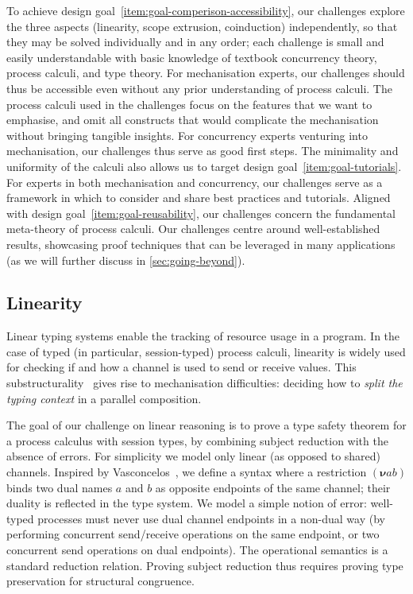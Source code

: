 \documentclass[runningheads]{llncs}
\begin{document}
To achieve design goal~\ref{item:goal-comperison-accessibility}, our challenges explore the three aspects
(linearity, scope extrusion, coinduction) independently, so that they
may be solved individually and in any order; each challenge is small and easily understandable with basic knowledge of
textbook concurrency theory, process calculi, and type theory.
For mechanisation experts, our challenges should thus be accessible even without any prior understanding of process calculi.
The process calculi used in the challenges focus on the features that we want to emphasise, and omit all constructs that would complicate the mechanisation without bringing tangible insights.
For concurrency experts venturing into mechanisation, our challenges thus serve as good first steps.
The minimality and uniformity of the calculi also allows us to target design goal~\ref{item:goal-tutorials}.
For experts in both mechanisation and concurrency, our challenges serve as a framework in which to consider and share best practices and tutorials.
Aligned with design goal~\ref{item:goal-reusability}, our challenges concern the fundamental meta-theory of process calculi.
Our challenges centre around well-established results, showcasing proof techniques that can be leveraged in many applications (as we will further discuss in \cref{sec:going-beyond}).

\subsection{Linearity}
Linear typing systems enable the tracking of resource usage in a program. In
the case of typed (in particular, session-typed) process calculi, linearity is
widely used for checking if and how a channel is used to send or receive values.
This substructurality~\cite[Ch. 1]{Pierce2004-oq} gives rise to mechanisation difficulties: \eg deciding how to \emph{split the
typing context} in a parallel composition.

The goal of our challenge on linear reasoning is to prove a type safety theorem
for a process calculus with session types, by combining subject
reduction with the absence of errors.  For simplicity we model only linear (as
opposed to shared) channels. Inspired by Vasconcelos~\cite{Vasconcelos2012}, we
define a syntax where a restriction $(\bm{\nu} ab)$ binds two dual names $a$
and $b$ as opposite endpoints of the same channel; their duality is
reflected in the type system. We model a simple notion of error: well-typed
processes must never use dual channel endpoints in a non-dual way (\eg by
performing concurrent send/receive operations on the same endpoint, or two
concurrent send operations on dual endpoints).
The operational semantics is a standard reduction relation. Proving subject reduction thus requires proving type preservation for structural congruence.
\end{document}
